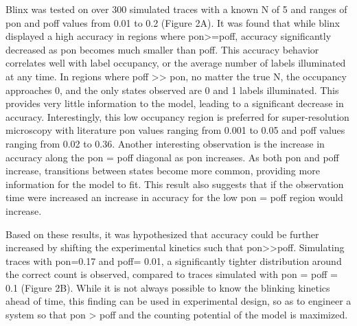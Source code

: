 Blinx was tested on over 300 simulated traces with a known N of 5 and ranges of
pon and poff values from 0.01 to 0.2 (Figure 2A). It was found that while blinx
displayed a high accuracy in regions where pon>=poff, accuracy significantly
decreased as pon becomes much smaller than poff. This accuracy behavior
correlates well with label occupancy, or the average number of labels
illuminated at any time. In regions where poff >> pon, no matter the true N,
the occupancy approaches 0, and the only states observed are 0 and 1 labels
illuminated. This provides very little information to the model, leading to a
significant decrease in accuracy. Interestingly, this low occupancy region is
preferred for super-resolution microscopy with literature pon values ranging
from 0.001 to 0.05 and poff values ranging from 0.02 to 0.36. Another
interesting observation is the increase in accuracy along the pon = poff
diagonal as pon increases. As both pon and poff increase, transitions between
states become more common, providing more information for the model to fit.
This result also suggests that if the observation time were increased an
increase in accuracy for the low pon = poff region would increase.

Based on these results, it was hypothesized that accuracy could be further
increased by shifting the experimental kinetics such that pon>>poff. Simulating
traces with pon=0.17 and poff= 0.01, a significantly tighter distribution
around the correct count is observed, compared to traces simulated with pon =
poff = 0.1 (Figure 2B). While it is not always possible to know the blinking
kinetics ahead of time, this finding can be used in experimental design, so as
to engineer a system so that pon > poff and the counting potential of the model
is maximized.
